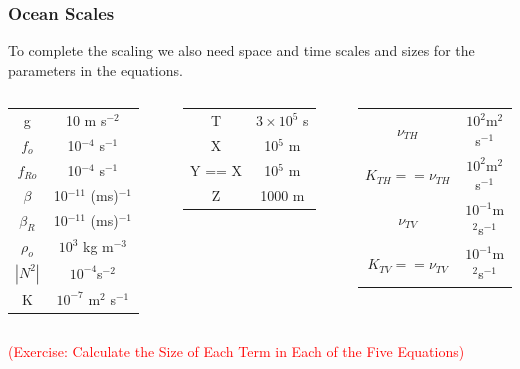 \documentclass[xcolor=dvipsnames]{beamer}
\begin{document}
\begin{frame}
\frametitle{Ocean Scales}

To complete the scaling we also need space and time scales and sizes for the parameters in the equations.\\ \vspace{0.2in}

\begin{columns}[c]
\column{2in}
\begin{tabular}{cc}
\hline
g & 10 m s$^{-2}$\\
$f_o$ & 10$^{-4}$ s$^{-1}$\\
$f_{Ro}$ & 10$^{-4}$ s$^{-1}$\\
$\beta$ &  10$^{-11}$ (ms)$^{-1}$\\
$\beta_R$ &  10$^{-11}$ (ms)$^{-1}$\\
$\rho_o$ & $10^3$ kg m$^{-3}$\\
$|N^2|$ & $10^{-4}$s$^{-2}$\\
K & $10^{-7}$ m$^{2}$ s$^{-1}$\\
\hline
\end{tabular}
\column{2in}
\begin{tabular}{cc}
\hline
T & $3 \times 10^5$ s\\
X & 10$^5$ m\\
Y == X  & 10$^5$ m\\
Z & 1000 m\\
\hline
\end{tabular}
\begin{tabular}{cc}
\hline
$\nu_{TH}$ &$10^{2}$m$^{2}$s$^{-1}$\\
$K_{TH} == \nu_{TH} $&$10^{2}$m$^{2}$s$^{-1}$\\
$\nu_{TV} $&$10^{-1}$m$^{2}$s$^{-1}$\\
$K_{TV} == \nu_{TV}  $&$10^{-1}$m$^{2}$s$^{-1}$\\
\hline
\end{tabular}
\end{columns}\vspace{0.2in}

\textcolor{red}{(Exercise: Calculate the Size of Each Term in Each of the Five Equations)}

\end{frame}
\end{document}
